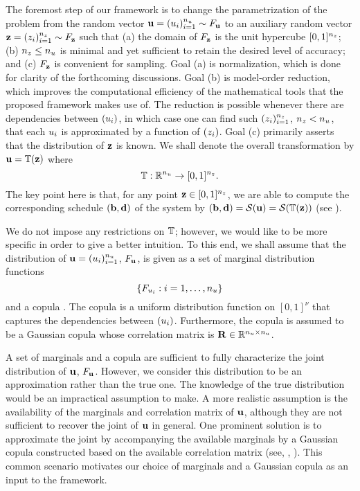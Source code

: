 The foremost step of our framework is to change the parametrization of the
problem from the random vector $\mathbf{u} = (u_i)_{i = 1}^{n_u} \sim F_{\mathbf{u}}$
to an auxiliary random vector $\mathbf{z} = (z_i)_{i = 1}^{n_z} \sim F_{\mathbf{z}}$
such that (a) the domain of $F_{\mathbf{z}}$ is the unit hypercube $[0,
1]^{n_z}$; (b) ${n_z} \leq {n_u}$ is minimal and yet sufficient to retain the desired
level of accuracy; and (c) $F_{\mathbf{z}}$ is convenient for sampling. Goal
(a) is normalization, which is done for clarity of the forthcoming discussions.
Goal (b) is model-order reduction, which improves the computational efficiency
of the mathematical tools that the proposed framework makes use of. The
reduction is possible whenever there are dependencies between $(u_i)$, in which
case one can find such $(z_i)_{i = 1}^{n_z}$, ${n_z} < {n_u}$, that each $u_i$ is
approximated by a function of $(z_i)$. Goal (c) primarily asserts that the
distribution of $\mathbf{z}$ is known. We shall denote the overall transformation by
$\mathbf{u} = \mathbb{T}(\mathbf{z})$ where
\begin{equation} \elab{transformation}
  \transformation: \real^\nu \to [0, 1]^\nz.
\end{equation}
The key point here is that, for any point $\mathbf{z} \in [0, 1]^{n_z}$, we are able to
compute the corresponding schedule $(\mathbf{b}, \mathbf{d})$ of the system by $(\mathbf{b}, \mathbf{d}) =
\mathcal{S}(\mathbf{u}) = \mathcal{S}(\mathbb{T}(\mathbf{z}))$ (see
).

We do not impose any restrictions on $\mathbb{T}$; however, we would like
to be more specific in order to give a better intuition. To this end, we shall
assume that the distribution of $\mathbf{u} = (u_i)_{i = 1}^{n_u}$, $F_{\mathbf{u}}$,
is given as a set of marginal distribution functions
\[
  \{ F_{u_i}: i = 1, \dots, {n_u} \}
\]
and a copula \cite{nelsen2006}. The copula is a uniform distribution function on
$[0, 1]^\nu$ that captures the dependencies between $(u_i)$. Furthermore, the
copula is assumed to be a Gaussian copula whose correlation matrix is
$\mathbf{R} \in \mathbb{R}^{{n_u} \times {n_u}}$.

\begin{remark}
A set of marginals and a copula are sufficient to fully characterize the joint
distribution of $\mathbf{u}$, $F_{\mathbf{u}}$. However, we consider this
distribution to be an approximation rather than the true one. The knowledge of
the true distribution would be an impractical assumption to make. A more
realistic assumption is the availability of the marginals and correlation matrix
of $\mathbf{u}$, although they are not sufficient to recover the joint of $\mathbf{u}$ in
general. One prominent solution is to approximate the joint by accompanying the
available marginals by a Gaussian copula constructed based on the available
correlation matrix (see, \eg, \cite{ukhov2014}). This common scenario motivates
our choice of marginals and a Gaussian copula as an input to the framework.
\end{remark}

